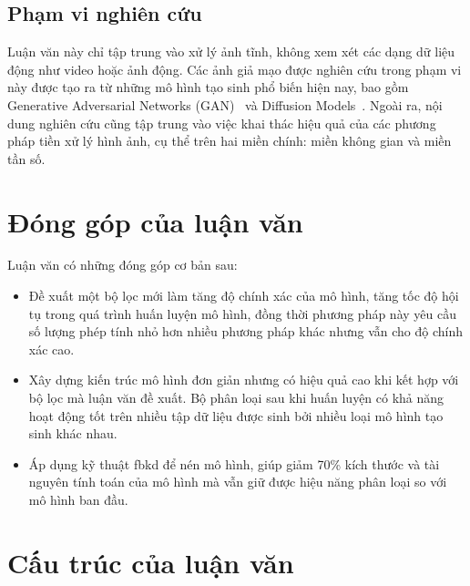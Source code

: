 \subsection{Phạm vi nghiên cứu}

%

Luận văn này chỉ tập trung vào xử lý ảnh tĩnh, không xem xét các dạng dữ liệu động như video hoặc ảnh động. Các ảnh giả mạo được nghiên cứu trong phạm vi này được tạo ra từ những mô hình tạo sinh phổ biến hiện nay, bao gồm Generative Adversarial Networks (GAN)~\cite{Goodfellow2014GenerativeAN} và Diffusion Models~\cite{Ho2020DenoisingDP}. Ngoài ra, nội dung nghiên cứu cũng tập trung vào việc khai thác hiệu quả của các phương pháp tiền xử lý hình ảnh, cụ thể trên hai miền chính: miền không gian và miền tần số.


\section{Đóng góp của luận văn}
Luận văn có những đóng góp cơ bản sau:
\begin{itemize}
	\item Đề xuất một bộ lọc mới làm tăng độ chính xác của mô hình, tăng tốc độ hội tụ trong quá trình huấn luyện mô hình, đồng thời phương pháp này yêu cầu số lượng phép tính nhỏ hơn nhiều phương pháp khác nhưng vẫn cho độ chính xác cao.
	\item Xây dựng kiến trúc mô hình đơn giản nhưng có hiệu quả cao khi kết hợp với bộ lọc mà luận văn đề xuất. Bộ phân loại sau khi huấn luyện có khả năng hoạt động tốt trên nhiều tập dữ liệu được sinh bởi nhiều loại mô hình tạo sinh khác nhau.
	\item Áp dụng kỹ thuật \gls{fbkd} để nén mô hình, giúp giảm 70\% kích thước và tài nguyên tính toán của mô hình mà vẫn giữ được hiệu năng phân loại so với mô hình ban đầu.

\end{itemize}

\section{Cấu trúc của luận văn}

